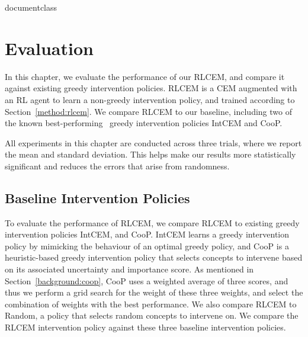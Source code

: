 \csname documentclass

\chapter{Evaluation}\label{chapter-4}

In this chapter, we evaluate the performance of our RLCEM, and compare it 
against existing greedy intervention policies. RLCEM is a CEM augmented with an RL agent
to learn a non-greedy intervention policy, and trained according to Section~\ref{method:rlcem}.
We compare RLCEM to our baseline, 
including two of the known best-performing~\cite{intcem} 
greedy intervention policies
IntCEM and CooP.


All experiments in this chapter
are conducted across three trials, where we report the mean
and standard deviation. This helps make our results more statistically significant and reduces the errors
that arise from randomness.

\section{Baseline Intervention Policies}
To evaluate the performance of RLCEM, we compare RLCEM to existing greedy intervention policies IntCEM, and CooP.
 IntCEM learns a greedy intervention policy
by mimicking the behaviour of an optimal greedy policy,
and CooP is a heuristic-based greedy intervention policy
that selects concepts to intervene based on its associated uncertainty
and importance score. As mentioned in
Section~\ref{background:coop}, CooP uses a weighted average
of three scores, and thus we perform a grid search for the weight 
of these three weights, and select the combination of weights with the best performance.
We also compare RLCEM to Random, a policy that selects
random concepts to intervene on.
We compare the RLCEM intervention policy against these three baseline intervention policies.

